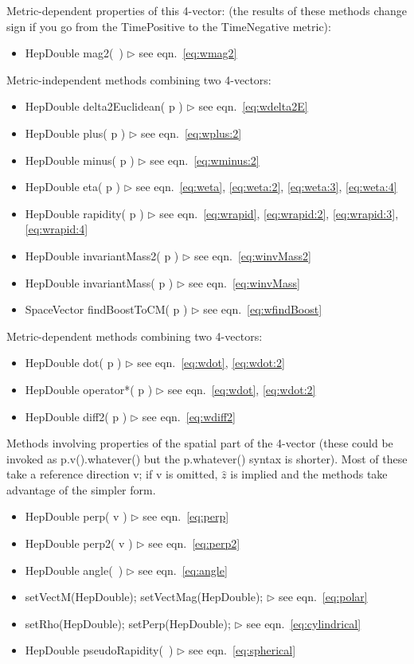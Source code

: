 \documentclass[twoside,12pt]{article}
\newcommand {\see}[1] {\hfill$\triangleright$ see eqn.~#1}
\newenvironment{shortlist}{%
\begin{itemize}
\setlength{\itemsep}{0pt}
\setlength{\parskip}{0pt}
}{%
\end{itemize}
}
\begin{document}
\noindent
Metric-dependent properties of this 4-vector:
(the results of these methods change sign if you go from the
TimePositive to the TimeNegative metric):
\begin{shortlist}
  \item HepDouble mag2(~) \see{\ref{eq:wmag2}}
\end{shortlist}

\noindent
Metric-independent methods combining two 4-vectors:
\begin{shortlist}
  \item HepDouble delta2Euclidean( p ) \see{\ref{eq:wdelta2E}}
  \item HepDouble plus( p ) \see{\ref{eq:wplus:2}}
  \item HepDouble minus( p ) \see{\ref{eq:wminus:2}}
  \item HepDouble eta( p ) \see{\ref{eq:weta}, \ref{eq:weta:2}, \ref{eq:weta:3}, \ref{eq:weta:4}}
  \item HepDouble rapidity( p ) \see{\ref{eq:wrapid}, \ref{eq:wrapid:2}, \ref{eq:wrapid:3}, \ref{eq:wrapid:4}}  
  \item HepDouble invariantMass2( p ) \see{\ref{eq:winvMass2}}
  \item HepDouble invariantMass( p ) \see{\ref{eq:winvMass}}
  \item SpaceVector findBoostToCM( p ) \see{\ref{eq:wfindBoost}}
\end{shortlist}

\noindent
Metric-dependent methods combining two 4-vectors:
\begin{shortlist}
  \item HepDouble dot( p ) \see{\ref{eq:wdot}, \ref{eq:wdot:2}}
  \item HepDouble operator*( p ) \see{\ref{eq:wdot}, \ref{eq:wdot:2}}
  \item HepDouble diff2( p ) \see{\ref{eq:wdiff2}}
\end{shortlist}


\noindent 
Methods involving properties of the spatial part of the 4-vector
(these could be invoked as p.v().whatever() but the p.whatever()
syntax is shorter).  
Most of these take a reference direction v; if v is omitted,
$\hat{z}$ is implied and the methods take advantage of the simpler form.
\begin{shortlist}
  \item HepDouble perp( v ) \see{\ref{eq:perp}}
  \item HepDouble perp2( v ) \see{\ref{eq:perp2}}
  \item HepDouble angle(~) \see{\ref{eq:angle}}
  \item setVectM(HepDouble); \/\/\/  setVectMag(HepDouble); 
						\see{\ref{eq:polar}}
  \item setRho(HepDouble); \/\/\/  setPerp(HepDouble); 
						\see{\ref{eq:cylindrical}}
  \item HepDouble pseudoRapidity(~) \see{\ref{eq:spherical}}
\end{shortlist}
\end{document}
